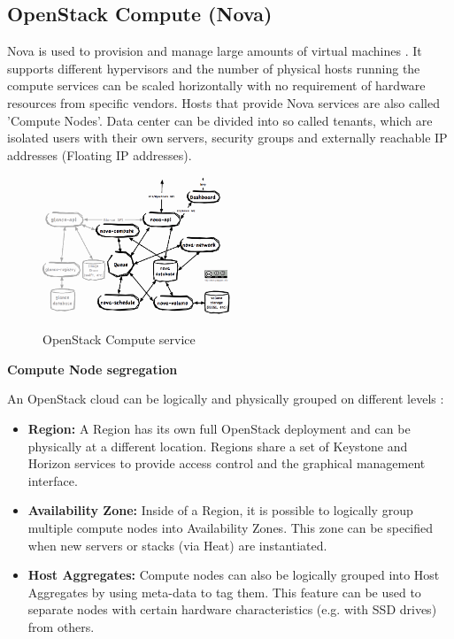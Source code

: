 \subsection{OpenStack Compute (Nova)}

Nova is used to provision and manage large amounts of virtual machines . It supports different hypervisors and the number of physical hosts running the compute services can be scaled horizontally with no requirement of hardware resources from specific vendors. Hosts that provide Nova services are also called 'Compute Nodes'. Data center can be divided into so called tenants, which are isolated users with their own servers, security groups and externally reachable IP addresses (Floating IP addresses). 

\begin{figure}[H]
\centering
\includegraphics[width=0.5\textwidth]{images/fundamentals/openstack_nova.png}
\caption{OpenStack Compute service} \cite{nova-arch}
\end{figure}

\textbf{Compute Node segregation}

An OpenStack cloud can be logically and physically grouped on different levels \cite{openstack-ops}:
\begin{itemize}
\item \textbf{Region:} A Region has its own full OpenStack deployment and can be physically at a different location. Regions share a set of Keystone and Horizon services to provide access control and the graphical management interface.
\item \textbf{Availability Zone:} Inside of a Region, it is possible to logically group multiple compute nodes into Availability Zones. This zone can be specified when new servers or stacks (via Heat) are instantiated.
\item \textbf{Host Aggregates:} Compute nodes can also be logically grouped into Host Aggregates by using meta-data to tag them. This feature can be used to separate nodes with certain hardware characteristics (e.g. with SSD drives) from others.
\end{itemize}

